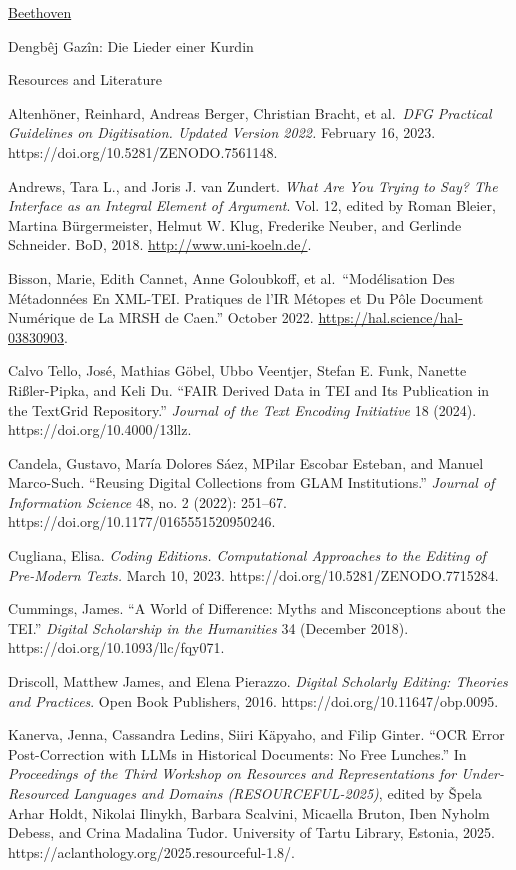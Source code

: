 \documentclass[
  letterpaper,
  DIV=11,
  numbers=noendperiod]{scrreprt}
\begin{document}
\href{https://beethovens-werkstatt.de/}{Beethoven}

Dengbêj Gazîn: Die Lieder einer Kurdin

Resources and Literature

Altenhöner, Reinhard, Andreas Berger, Christian Bracht, et al.~\emph{DFG
Practical Guidelines on Digitisation. Updated Version 2022.} February
16, 2023. https://doi.org/10.5281/ZENODO.7561148.

Andrews, Tara L., and Joris J. van Zundert. \emph{What Are You Trying to
Say? The Interface as an Integral Element of Argument}. Vol. 12, edited
by Roman Bleier, Martina Bürgermeister, Helmut W. Klug, Frederike
Neuber, and Gerlinde Schneider. BoD, 2018.
\url{http://www.uni-koeln.de/}.

Bisson, Marie, Edith Cannet, Anne Goloubkoff, et al.~``Modélisation Des
Métadonnées En XML-TEI. Pratiques de l'IR Métopes et Du Pôle Document
Numérique de La MRSH de Caen.'' October 2022.
\url{https://hal.science/hal-03830903}.

Calvo Tello, José, Mathias Göbel, Ubbo Veentjer, Stefan E. Funk, Nanette
Rißler-Pipka, and Keli Du. ``FAIR Derived Data in TEI and Its
Publication in the TextGrid Repository.'' \emph{Journal of the Text
Encoding Initiative} 18 (2024). https://doi.org/10.4000/13llz.

Candela, Gustavo, María Dolores Sáez, MPilar Escobar Esteban, and Manuel
Marco-Such. ``Reusing Digital Collections from GLAM Institutions.''
\emph{Journal of Information Science} 48, no. 2 (2022): 251--67.
https://doi.org/10.1177/0165551520950246.

Cugliana, Elisa. \emph{Coding Editions. Computational Approaches to the
Editing of Pre-Modern Texts.} March 10, 2023.
https://doi.org/10.5281/ZENODO.7715284.

Cummings, James. ``A World of Difference: Myths and Misconceptions about
the TEI.'' \emph{Digital Scholarship in the Humanities} 34 (December
2018). https://doi.org/10.1093/llc/fqy071.

Driscoll, Matthew James, and Elena Pierazzo. \emph{Digital Scholarly
Editing: Theories and Practices}. Open Book Publishers, 2016.
https://doi.org/10.11647/obp.0095.

Kanerva, Jenna, Cassandra Ledins, Siiri Käpyaho, and Filip Ginter. ``OCR
Error Post-Correction with LLMs in Historical Documents: No Free
Lunches.'' In \emph{Proceedings of the Third Workshop on Resources and
Representations for Under-Resourced Languages and Domains
(RESOURCEFUL-2025)}, edited by Špela Arhar Holdt, Nikolai Ilinykh,
Barbara Scalvini, Micaella Bruton, Iben Nyholm Debess, and Crina
Madalina Tudor. University of Tartu Library, Estonia, 2025.
https://aclanthology.org/2025.resourceful-1.8/.
\end{document}
